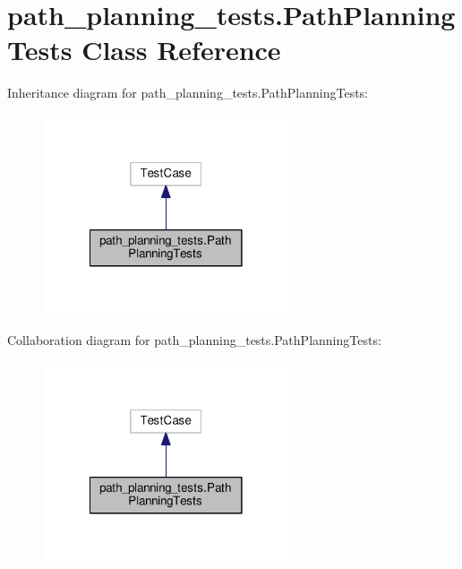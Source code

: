 \hypertarget{classpath__planning__tests_1_1PathPlanningTests}{\section{path\-\_\-planning\-\_\-tests.\-Path\-Planning\-Tests Class Reference}
\label{classpath__planning__tests_1_1PathPlanningTests}
}


Inheritance diagram for path\-\_\-planning\-\_\-tests.\-Path\-Planning\-Tests\-:
\nopagebreak
\begin{figure}[H]
\begin{center}
\leavevmode
\includegraphics[width=206pt]{classpath__planning__tests_1_1PathPlanningTests__inherit__graph}
\end{center}
\end{figure}


Collaboration diagram for path\-\_\-planning\-\_\-tests.\-Path\-Planning\-Tests\-:
\nopagebreak
\begin{figure}[H]
\begin{center}
\leavevmode
\includegraphics[width=206pt]{classpath__planning__tests_1_1PathPlanningTests__coll__graph}
\end{center}
\end{figure}
